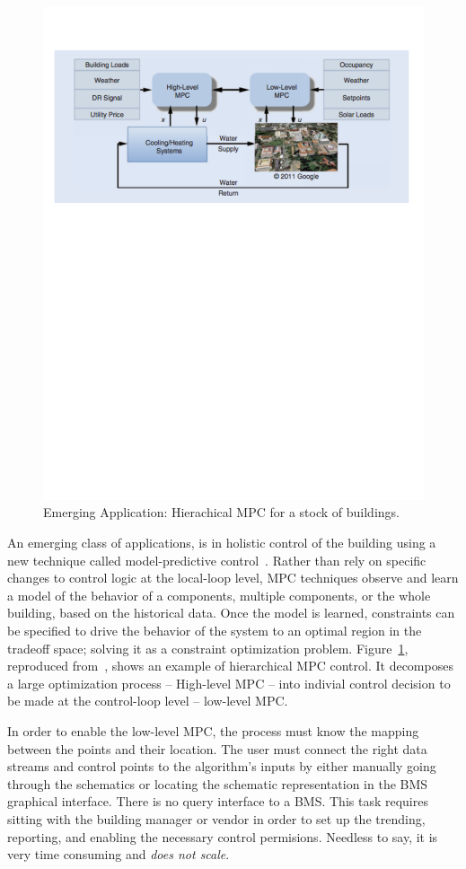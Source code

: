 \begin{figure}[t!] %
\centering
\includegraphics[width=0.75\columnwidth]{figs/mpc1}
\caption{Emerging Application: Hierachical MPC for a stock of buildings.}
\label{fig:mpc1}
\end{figure}

An emerging class of applications, is in holistic control of the building using a new technique called model-predictive control~\cite{MPC_yudong}.
Rather than rely on specific changes to control logic at the local-loop level, MPC techniques observe and learn a model
of the behavior of a components, multiple components, or the whole building, based on the historical data.  Once the model is learned, 
constraints can be specified to drive the behavior of the system to an optimal region in the tradeoff space; solving it as 
a constraint optimization problem.  Figure~\ref{fig:mpc1}, reproduced from~\cite{MPC_yudong}, shows an example of hierarchical MPC control.  
It decomposes a large optimization process -- High-level MPC --  into indivial control decision to be made at the control-loop level --
low-level MPC.

In order to enable the low-level MPC, the process must know the mapping between the points and their location.
The user must connect the right data streams and control points to the algorithm's inputs by either manually going through the schematics or
locating the schematic representation in the BMS graphical interface.  There is no query interface to a BMS.  This task requires sitting 
with the building manager or vendor in order to set up the trending, reporting, and enabling the necessary control permisions.
Needless to say, it is very time consuming and \emph{does not scale}.

